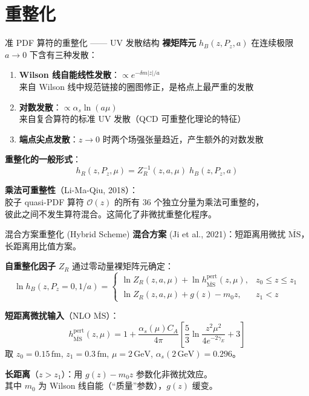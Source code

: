 \documentclass[10pt,aspectratio=169]{beamer}
\newcommand{\msbar}{\overline{\mathrm{MS}}}
\newcommand{\alphas}{\alpha_s}
\newcommand{\GeV}{\,\mathrm{GeV}}
\newcommand{\fm}{\,\mathrm{fm}}
\newcommand{\Pz}{P_z}
\newcommand{\CA}{C_A}
\begin{document}
\section{重整化}

\begin{frame}{准 PDF 算符的重整化 —— UV 发散结构}
\small
\textbf{裸矩阵元} $h_B(z, \Pz, a)$ 在连续极限 $a \to 0$ 下含有三种发散：

\begin{enumerate}
  \item \textbf{Wilson 线自能线性发散}：$\propto e^{-\delta m |z|/a}$\\
  来自 Wilson 线中规范链接的圈图修正，是格点上最严重的发散
  \item \textbf{对数发散}：$\propto \alphas \ln(a\mu)$\\
  来自复合算符的标准 UV 发散（QCD 可重整化理论的特征）
  \item \textbf{端点尖点发散}：$z \to 0$ 时两个场强张量趋近，产生额外的对数发散
\end{enumerate}

\textbf{重整化的一般形式}：
\begin{equation}
  h_R(z, \Pz, \mu) = Z_R^{-1}(z, a, \mu)\;h_B(z, \Pz, a)
\end{equation}

\textbf{乘法可重整性}（Li-Ma-Qiu, 2018）：\\
胶子 quasi-PDF 算符 $\mathcal{O}(z)$ 的所有 36 个独立分量为乘法可重整的，\\
彼此之间不发生算符混合。这简化了非微扰重整化程序。
\end{frame}

\begin{frame}{混合方案重整化 (Hybrid Scheme)}
\small
\textbf{混合方案} (Ji et al., 2021)：短距离用微扰 $\msbar$，长距离用比值方案。

\textbf{自重整化因子} $Z_R$ 通过零动量裸矩阵元确定：
\begin{equation}
  \boxed{
  \ln h_B(z, \Pz=0, 1/a) =
  \begin{cases}
    \ln Z_R(z,a,\mu) + \ln h_{\msbar}^{\text{pert}}(z,\mu), & z_0 \le z \le z_1 \\[4pt]
    \ln Z_R(z,a,\mu) + g(z) - m_0 z, & z_1 < z
  \end{cases}
  }
\end{equation}

\textbf{短距离微扰输入}（NLO $\msbar$）：
\begin{equation}
  \boxed{
  h_{\msbar}^{\text{pert}}(z, \mu) = 1 + \frac{\alphas(\mu)\CA}{4\pi}
  \left[\frac{5}{3}\ln\frac{z^2\mu^2}{4e^{-2\gamma_E}} + 3\right]
  }
\end{equation}
取 $z_0 = 0.15\fm$, $z_1 = 0.3\fm$, $\mu = 2\GeV$, $\alphas(2\GeV) = 0.296$。

\textbf{长距离}（$z > z_1$）：用 $g(z) - m_0 z$ 参数化非微扰效应。\\
其中 $m_0$ 为 Wilson 线自能（``质量''参数），$g(z)$ 缓变。
\end{frame}
\end{document}
